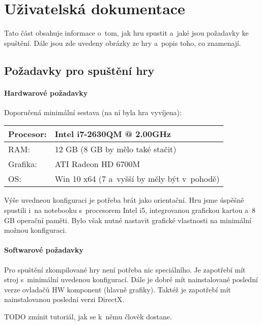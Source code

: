 
\chapter{Uživatelská dokumentace}

Tato část obsahuje informace o~tom, jak hru spustit a~jaké jsou požadavky ke spuštění. Dále jsou zde uvedeny obrázky ze hry a~popis toho, co znamenají. 

\section{Požadavky pro spuštění hry}
\subsubsection{Hardwarové požadavky}

Doporučená minimální sestava (na ní byla hra vyvíjena): 

\begin{center}
	\begin{tabular} { | l | l |}
		\hline
		Procesor: 	&	Intel i7-2630QM @ 2.00GHz \\	\hline
		RAM:		&	12 GB	(8 GB by mělo také stačit) \\	\hline
		Grafika:	&	ATI Radeon HD 6700M \\	\hline
		OS:			&	Win 10 x64	(7 a~vyšší by měly být v~pohodě) \\
		\hline
	\end{tabular}
\end{center}

Výše uvedneou konfiguraci je potřeba brát jako orientační. Hru jsme úspěšně spustili i~na notebooku s~procesorem Intel i5, integrovanou grafickou kartou a~8 GB operační paměti. Bylo však nutné nastavit grafické vlastnosti na minimální možnou konfiguraci. 

\subsubsection{Softwarové požadavky}

Pro spuštění zkompilované hry není potřeba nic speciálního. Je zapotřebí mít stroj s~minimální uvedenou konfigurací. Dále je dobré mít nainstalované poslední verze ovladačů HW komponent (hlavně grafiky).
Taktéž je zapotřebí mít nainstalovanou poslední verzi DirectX. 



TODO zmínit tutoriál, jak se k~němu člověk dostane.

%
%
%
%
%
%
%
%
%
%

